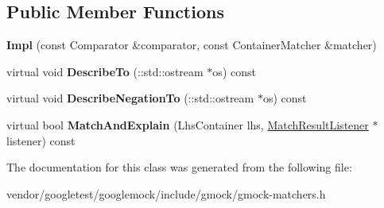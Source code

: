 \subsection*{Public Member Functions}
\begin{DoxyCompactItemize}
\item 
{\bfseries Impl} (const Comparator \&comparator, const Container\+Matcher \&matcher)\hypertarget{classtesting_1_1internal_1_1WhenSortedByMatcher_1_1Impl_a63235e98dec5478b7ff9d06f6babc716}{}\label{classtesting_1_1internal_1_1WhenSortedByMatcher_1_1Impl_a63235e98dec5478b7ff9d06f6babc716}

\item 
virtual void {\bfseries Describe\+To} (\+::std\+::ostream $\ast$os) const \hypertarget{classtesting_1_1internal_1_1WhenSortedByMatcher_1_1Impl_a1550eab3f77ff48b54d7a0d33a9d8f31}{}\label{classtesting_1_1internal_1_1WhenSortedByMatcher_1_1Impl_a1550eab3f77ff48b54d7a0d33a9d8f31}

\item 
virtual void {\bfseries Describe\+Negation\+To} (\+::std\+::ostream $\ast$os) const \hypertarget{classtesting_1_1internal_1_1WhenSortedByMatcher_1_1Impl_af484d525e5dc6c3ba48c57f0c3696b54}{}\label{classtesting_1_1internal_1_1WhenSortedByMatcher_1_1Impl_af484d525e5dc6c3ba48c57f0c3696b54}

\item 
virtual bool {\bfseries Match\+And\+Explain} (Lhs\+Container lhs, \hyperlink{classtesting_1_1MatchResultListener}{Match\+Result\+Listener} $\ast$listener) const \hypertarget{classtesting_1_1internal_1_1WhenSortedByMatcher_1_1Impl_af63d23e035f9938be00fb3bb56977ee6}{}\label{classtesting_1_1internal_1_1WhenSortedByMatcher_1_1Impl_af63d23e035f9938be00fb3bb56977ee6}

\end{DoxyCompactItemize}


The documentation for this class was generated from the following file\+:\begin{DoxyCompactItemize}
\item 
vendor/googletest/googlemock/include/gmock/gmock-\/matchers.\+h\end{DoxyCompactItemize}
